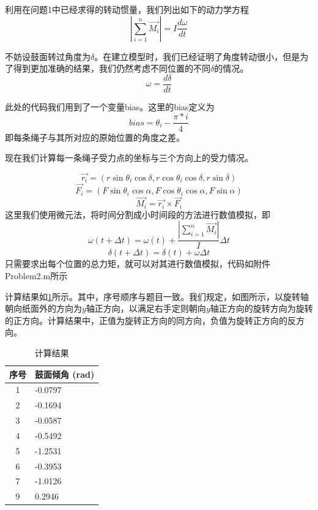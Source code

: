 \documentclass[nocover]{cumcmart}%
\begin{document}
利用在问题1中已经求得的转动惯量，我们列出如下的动力学方程
$$|\sum_{i = 1}^{n} \vec{M_i}| = I\frac{d\omega}{dt}$$

不妨设鼓面转过角度为$\delta$。在建立模型时，我们已经证明了角度转动很小，但是为了得到更加准确的结果，我们仍然考虑不同位置的不同$\delta$的情况。
$$\omega = \frac{d\delta}{dt}$$

此处的代码我们用到了一个变量bias。这里的bias定义为
$$bias = \theta_i - \frac{\pi*i}{4}$$
即每条绳子与其所对应的原始位置的角度之差。

现在我们计算每一条绳子受力点的坐标与三个方向上的受力情况。

$$\vec{r_i} = (r\sin{\theta_i}\cos{\delta}, r\cos{\theta_i}\cos{\delta}, r\sin{\delta})$$
$$\vec{F_i} = (F\sin{\theta_i}\cos{\alpha}, F\cos{\theta_i}\cos{\alpha}, F\sin{\alpha})$$
$$\vec{M_i} = \vec{r_i} \times \vec{F_i}$$
这里我们使用微元法，将时间分割成小时间段的方法进行数值模拟，即
$$\omega(t+\Delta t) = \omega(t) + \frac{|\sum_{i = 1}^{n} \vec{M_i}|}{I} \Delta t$$
$$\delta(t+\Delta t) = \delta(t) + \omega \Delta t$$
只需要求出每个位置的总力矩，就可以对其进行数值模拟，代码如附件Problem2.m所示

计算结果如\ref{table:result}所示。其中，序号顺序与题目一致。我们规定，如图所示，以旋转轴朝向纸面外的方向为$y$轴正方向，以满足右手定则朝向$y$轴正方向的旋转方向为旋转的正方向。计算结果中，正值为旋转正方向的同方向，负值为旋转正方向的反方向。
\begin{table} [!h]
\begin{center}
\vspace{-0.1in}
\caption{计算结果}
\label{table:result}
\begin{tabular}{|c|l|}
\hline
\textbf{序号}&\textbf{鼓面倾角 (rad)}\\
\hline
1&-0.0797\\
\hline
2& -0.1694\\
\hline
3& -0.0587\\
\hline
4&-0.5492\\
\hline
5&-1.2531\\
\hline
6&-0.3953\\
\hline
7&-1.0126\\
\hline
9&0.2946\\
\hline
\end{tabular}
\vspace{-0.2in}
\end{center}
\end{table}     
\end{document}
